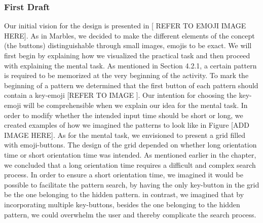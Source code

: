\subsubsection{First Draft}
Our initial vision for the design is presented in [ REFER TO EMOJI IMAGE HERE]. As in Marbles, we decided to make the different elements of the concept (the buttons) distinguishable through small images, emojis to be exact. We will first begin by explaining how we visualized the practical task and then proceed with explaining the mental task. As mentioned in Section 4.2.1, a certain pattern is required to be memorized at the very beginning of the activity. To mark the beginning of a pattern we determined that the first button of each pattern should contain a key-emoji [REFER TO IMAGE ]. Our intention for choosing the key-emoji will be comprehensible when we  explain our idea for the mental task. In order to modify whether the intended input time should be short or long, we created examples of how we imagined the patterns to look like in Figure [ADD IMAGE HERE]. As for the mental task, we envisioned to present a grid filled with emoji-buttons. The design of the grid depended on whether long orientation time or short orientation time was intended. As mentioned earlier in the chapter, we concluded that a long orientation time requires a difficult and complex search process. In order to ensure a short orientation time, we imagined it would be possible to facilitate the pattern search, by having the only key-button in the grid be the one belonging to the hidden pattern. in contrast, we imagined that by incorporating multiple key-buttons, besides the one belonging to the hidden pattern, we could overwhelm the user and thereby complicate the search process. 